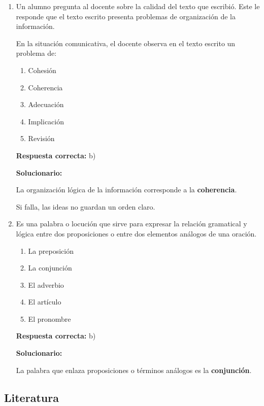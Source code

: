 \begin{enumerate}[resume]
	
	\vspace{6mm}
	
	\item Un alumno pregunta al docente sobre la calidad del texto que escribió. Este le responde que el texto escrito presenta problemas de organización de la información.
	
	En la situación comunicativa, el docente observa en el texto escrito un problema de:
	\begin{enumerate}[label=\alph*)]
		\item Cohesión
		\item Coherencia
		\item Adecuación
		\item Implicación
		\item Revisión
	\end{enumerate}
	\textbf{Respuesta correcta:} b)
	
	\vspace{2mm}
	\textbf{Solucionario:}
	
	La organización lógica de la información corresponde a la \textbf{coherencia}.
	
	Si falla, las ideas no guardan un orden claro.
	

	
	\vspace{6mm}
	
	\item Es una palabra o locución que sirve para expresar la relación gramatical y lógica entre dos proposiciones o entre dos elementos análogos de una oración.
	\begin{enumerate}[label=\alph*)]
		\item La preposición
		\item La conjunción
		\item El adverbio
		\item El artículo
		\item El pronombre
	\end{enumerate}
	\textbf{Respuesta correcta:} b)
	
	\vspace{2mm}
	\textbf{Solucionario:}
	
	La palabra que enlaza proposiciones o términos análogos es la \textbf{conjunción}.
	

	
	\vspace{6mm}
\end{enumerate}

\subsection*{Literatura}

